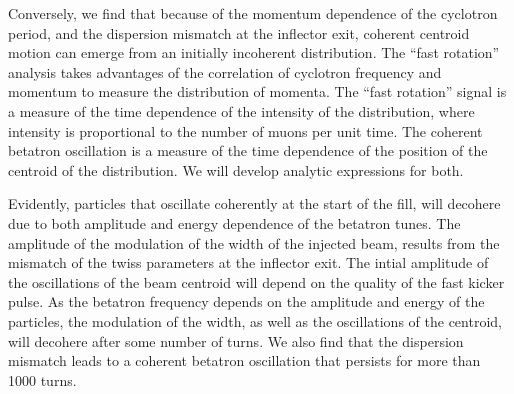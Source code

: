 \documentclass[10pt]{article}
\begin{document}
Conversely, we find that because of the momentum dependence of the cyclotron period, and the dispersion mismatch at the inflector exit, coherent centroid motion
can emerge from an initially incoherent distribution.
The ``fast rotation'' analysis takes advantages of the correlation of cyclotron frequency and momentum to measure the distribution of momenta. 
The ``fast rotation'' signal is a measure of the time dependence of the intensity of the distribution, where intensity is proportional to the number of muons per unit time.
The coherent betatron oscillation is a measure of the time dependence of the position of the centroid of the distribution.
We will develop analytic expressions for both.
%
%

Evidently, particles that oscillate coherently at the start of the fill, will decohere due to both amplitude and energy dependence of the betatron tunes. 
The amplitude of the modulation of the
width of the injected beam, results from the mismatch of the twiss parameters at the inflector exit. The intial amplitude of the oscillations 
of the beam centroid
will depend on the quality of the fast kicker pulse. As the betatron frequency depends on the amplitude and energy of the particles, 
the modulation of the width, as well as the oscillations of the centroid, will decohere after some number of turns. We also find that the dispersion mismatch
leads to a coherent betatron oscillation that persists for more than 1000 turns.
\end{document}
